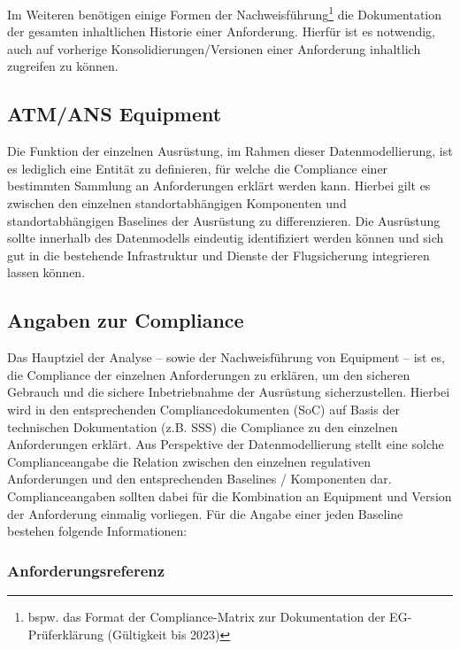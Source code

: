     \medskip
    Im Weiteren benötigen einige Formen der Nachweisführung\footnote{bspw. das Format der Compliance-Matrix zur Dokumentation der EG-Prüferklärung (Gültigkeit bis 2023)} die Dokumentation der gesamten inhaltlichen Historie einer Anforderung.
    Hierfür ist es notwendig, auch auf vorherige Konsolidierungen/Versionen einer Anforderung inhaltlich zugreifen zu können. 
    
\subsection{ATM/ANS Equipment}
    
    Die Funktion der einzelnen \atmans{} Ausrüstung, im Rahmen dieser Datenmodellierung, ist es lediglich eine Entität zu definieren, für welche die Compliance einer bestimmten Sammlung an Anforderungen erklärt werden kann.
    Hierbei gilt es zwischen den einzelnen standortabhängigen Komponenten und standortabhängigen Baselines der Ausrüstung zu differenzieren.
    Die Ausrüstung sollte innerhalb des Datenmodells eindeutig identifiziert werden können und sich gut in die bestehende Infrastruktur und Dienste der Flugsicherung integrieren lassen können.
    

\subsection{Angaben zur Compliance} \label{model_angaben}

    Das Hauptziel der Analyse -- sowie der Nachweisführung von \atmans{} Equip\-ment -- ist es, die Compliance der einzelnen Anforderungen zu erklären, um den sicheren Gebrauch und die sichere Inbetriebnahme der Ausrüstung sicherzustellen. 
    Hierbei wird in den entsprechenden Compliancedokumenten (\ac{SoC}) auf Basis der technischen Dokumentation (z.B. \ac{SSS}) die Compliance zu den einzelnen Anforderungen erklärt.
    Aus Perspektive der Datenmodellierung stellt eine solche Complianceangabe die Relation zwischen den einzelnen regulativen Anforderungen und den entsprechenden Baselines / Komponenten dar.
    Complianceangaben sollten dabei für die Kombination an Equipment und Version der Anforderung einmalig vorliegen. 
    Für die Angabe einer jeden Baseline bestehen folgende Informationen: 

\pagebreak
\subsubsection{Anforderungsreferenz}
\vspace{-1mm}
    
